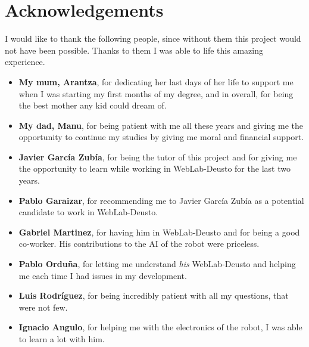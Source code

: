 \chapter*{Acknowledgements}

I would like to thank the following people, since without them this project would not have been
possible. Thanks to them I was able to life this amazing experience.

\begin{itemize}
	\item \textbf{My mum, Arantza}, for dedicating her last days of her life to support me when I
	was starting my first months of my degree, and in overall, for being the best mother any
	kid could dream of.

	\item \textbf{My dad, Manu}, for being patient with me all these years and giving me the
	opportunity to continue my studies by giving me moral and financial support.

	\item \textbf{Javier García Zubía}, for being the tutor of this project and for giving me the
	opportunity to learn while working in WebLab-Deusto for the last two years.

	\item \textbf{Pablo Garaizar}, for recommending me to Javier García Zubía as a
	potential candidate to work in WebLab-Deusto.

	\item \textbf{Gabriel Martinez}, for having him in WebLab-Deusto and for being a good co-worker.
	His contributions to the AI of the robot were priceless.

	\item \textbf{Pablo Orduña}, for letting me understand \textit{his} WebLab-Deusto and helping me
	each time I had issues in my development.

	\item \textbf{Luis Rodríguez}, for being incredibly patient with all my questions, that were not
	few.

	\item \textbf{Ignacio Angulo}, for helping me with the electronics of the robot, I was able to
	learn a lot with him.
\end{itemize}
